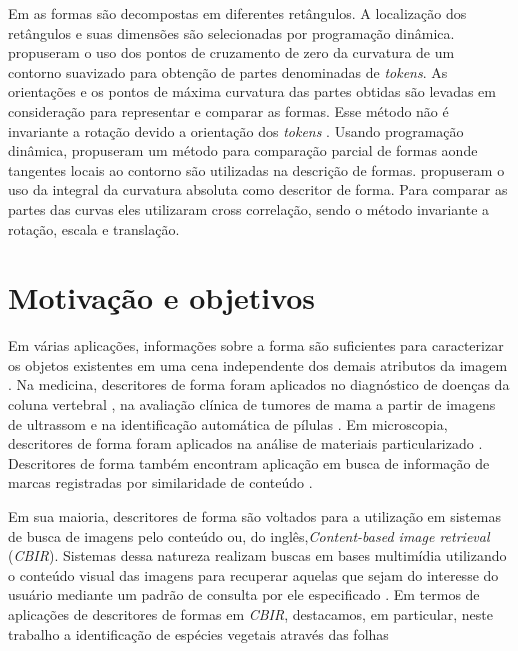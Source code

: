 Em \cite{Kenji:1992} as formas são decompostas em diferentes retângulos. A localização dos retângulos e suas dimensões são selecionadas por programação dinâmica.  propuseram o uso dos pontos de cruzamento de zero da curvatura de um contorno suavizado para obtenção de partes denominadas de \textit{tokens}. As orientações e os pontos de máxima curvatura das partes obtidas são levadas em consideração para representar e comparar as formas. Esse método não é invariante a rotação devido a orientação dos \textit{tokens} \cite{DiRuberto:2009}. Usando programação dinâmica,  propuseram um método para comparação parcial de formas aonde tangentes locais ao contorno são utilizadas na descrição de formas.  propuseram o uso da integral da curvatura absoluta como descritor de forma. Para comparar as partes das curvas eles utilizaram cross correlação, sendo o método invariante a rotação, escala e translação.  

\section{Motivação e objetivos \label{sec:motiv_obj}}
Em várias aplicações, informações sobre a forma são suficientes para caracterizar os objetos existentes em uma cena independente dos demais atributos da imagem \cite{Zhang201661,deSouza2016,Zhao20153203}. Na medicina, descritores de forma foram aplicados no diagnóstico de doenças da coluna vertebral \cite{Lee:2009}, na avaliação clínica de tumores de mama a partir de imagens de ultrassom \cite{Yang:2009} e na identificação automática de pílulas \cite{Ushizima:2015}. Em microscopia, descritores de forma foram aplicados na análise de materiais particularizado \cite{Zhang201661}. Descritores de forma também encontram aplicação em busca de informação de marcas registradas por similaridade de conteúdo \cite{MohdAnuar2013105,Qi20102017}.

Em sua maioria, descritores de forma \cite{Belongie:2002, 1467513, Nanni20122254, Hu20123348, Latecki:2007, Wang2012134} são voltados para a utilização em sistemas de busca de imagens pelo conteúdo ou, do inglês,\foreignlanguage{english}{\emph{Content-based image retrieval}} (\emph{CBIR}). Sistemas dessa natureza realizam buscas em bases multimídia utilizando o conteúdo visual das imagens para recuperar aquelas que sejam do interesse do usuário mediante um padrão de consulta por ele especificado \cite{Feng:2003}. Em termos de aplicações de descritores de formas em \emph{CBIR}, destacamos, em particular, neste trabalho a identificação de espécies vegetais através das folhas \cite{deSouza2016,
Fotopoulou:2013,Zhao20153203, Nam2008245, Wang:2000} 

